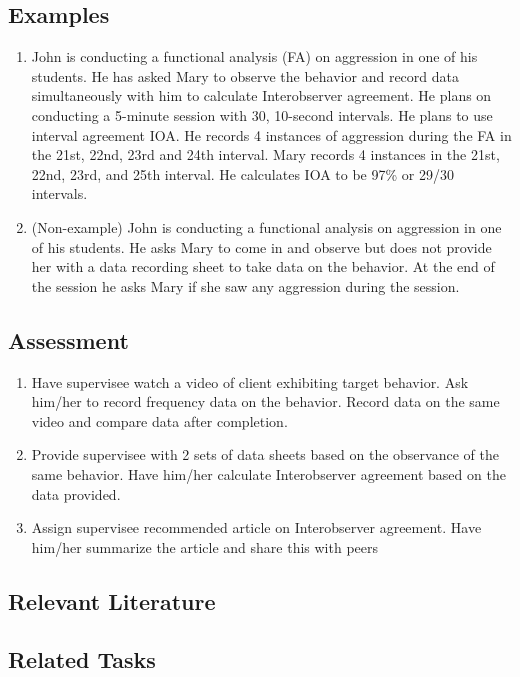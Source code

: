 \subsection{Examples}
\begin{enumerate}
\item John is conducting a functional analysis (FA) on aggression in one of his students. He has asked Mary to observe the behavior and record data simultaneously with him to calculate Interobserver agreement. He plans on conducting a 5-minute session with 30, 10-second intervals. He plans to use interval agreement IOA.  He records 4 instances of aggression during the FA in the 21st, 22nd, 23rd and 24th interval. Mary records 4 instances in the 21st, 22nd, 23rd, and 25th interval. He calculates IOA to be 97\% or 29/30 intervals.
\item (Non-example) John is conducting a functional analysis on aggression in one of his students. He asks Mary to come in and observe but does not provide her with a data recording sheet to take data on the behavior. At the end of the session he asks Mary if she saw any aggression during the session. 
\end{enumerate}
%
\subsection{Assessment}
\begin{enumerate}
\item Have supervisee watch a video of client exhibiting target behavior. Ask him/her to record frequency data on the behavior. Record data on the same video and compare data after completion. 
\item Provide supervisee with 2 sets of data sheets based on the observance of the same behavior. Have him/her calculate Interobserver agreement based on the data provided.
\item Assign supervisee recommended article on Interobserver agreement. Have him/her summarize the article and share this with peers 
\end{enumerate}
%
\subsection{Relevant Literature}
\begin{refsection}
\nocite{cooper2007applied,boyce2000evaluation,johnston2010strategies,watkins2000interobserver}
\printbibliography[heading=none]
\end{refsection}
%
\subsection{Related Tasks}
\fouraOne{}\\
\fouraNine{}\\
\fourbTwo{}\\
\fourgSix{}\\
\fourhTwo{}\\
\fouriOne{}\\
\fouriFive{}\\
\fourjNine{}\\
\fourkFive{}\\
%
%
%
%
